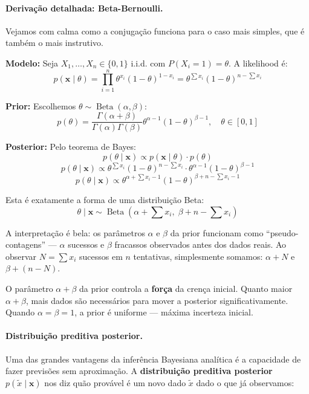 \documentclass{tufte-handout}
\DeclareMathOperator{\Beta}{Beta}
\begin{document}
\paragraph{Derivação detalhada: Beta-Bernoulli.}

Vejamos com calma como a conjugação funciona para o caso mais simples, que é também o mais instrutivo.

\textbf{Modelo:} Seja $X_1, \dots, X_n \in \{0,1\}$ i.i.d. com $P(X_i = 1) = \theta$. A likelihood é:
\[
p(\mathbf{x} \mid \theta) = \prod_{i=1}^n \theta^{x_i} (1-\theta)^{1-x_i} = \theta^{\sum x_i} (1-\theta)^{n - \sum x_i}
\]

\textbf{Prior:} Escolhemos $\theta \sim \Beta(\alpha, \beta)$:
\[
p(\theta) = \frac{\Gamma(\alpha+\beta)}{\Gamma(\alpha)\Gamma(\beta)} \theta^{\alpha-1} (1-\theta)^{\beta-1}, \quad \theta \in [0,1]
\]

\textbf{Posterior:} Pelo teorema de Bayes:
\[
p(\theta \mid \mathbf{x}) \propto p(\mathbf{x} \mid \theta) \cdot p(\theta)
\]
\[
p(\theta \mid \mathbf{x}) \propto \theta^{\sum x_i} (1-\theta)^{n - \sum x_i} \cdot \theta^{\alpha-1} (1-\theta)^{\beta-1}
\]
\[
p(\theta \mid \mathbf{x}) \propto \theta^{\alpha + \sum x_i - 1} (1-\theta)^{\beta + n - \sum x_i - 1}
\]

Esta é exatamente a forma de uma distribuição Beta:
\[
\theta \mid \mathbf{x} \sim \Beta\!\left(\alpha + \sum x_i,\; \beta + n - \sum x_i\right)
\]

A interpretação é bela: os parâmetros $\alpha$ e $\beta$ da prior funcionam como ``pseudo-contagens'' --- $\alpha$ sucessos e $\beta$ fracassos observados antes dos dados reais. Ao observar $N = \sum x_i$ sucessos em $n$ tentativas, simplesmente somamos: $\alpha + N$ e $\beta + (n-N)$.

\begin{remark}
    O parâmetro $\alpha + \beta$ da prior controla a \textbf{força} da crença inicial. Quanto maior $\alpha + \beta$, mais dados são necessários para mover a posterior significativamente. Quando $\alpha = \beta = 1$, a prior é uniforme --- máxima incerteza inicial.
\end{remark}

\paragraph{Distribuição preditiva posterior.}

Uma das grandes vantagens da inferência Bayesiana analítica é a capacidade de fazer previsões sem aproximação. A \textbf{distribuição preditiva posterior} $p(\tilde{x} \mid \mathbf{x})$ nos diz quão provável é um novo dado $\tilde{x}$ dado o que já observamos:
\end{document}
